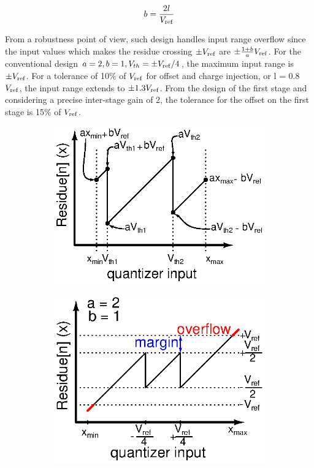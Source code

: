 \begin{equation}
b = \frac{2l}{V_{\rm ref}}
\end{equation}

From a robustness point of view, such design handles input range overflow since the input values which makes the residue crossing \(\pm V_{\rm ref}\) are \(\pm \frac{1+b}{a}V_{\rm ref}\). For the conventional design \(a=2, b=1, V_{th}=\pm V_{\rm ref}/4\), the maximum input range is \(\pm V_{\rm ref}\). For a tolerance of 10\% of \(V_{\rm ref}\) for offset and charge injection, or l = 0.8 \(V_{\rm ref}\), the input range extends to \(\pm 1.3 V_{\rm ref}\). From the design of the first stage and considering a precise inter-stage gain of 2, the tolerance for the offset on the first stage is 15\% of \(V_{\rm ref}\).

\begin{figure}[htp]
	\centering
	\begin{subfigure}[b]{0.32\textwidth}
		\centering
		\includegraphics[width=\textwidth]{Chapter4/Figs/3-levels-pattern-algo.ps}
		\label{fig:algo-general}
	\end{subfigure}
	\begin{subfigure}[b]{0.32\textwidth}
		\centering
		\includegraphics[width=\textwidth]{Chapter4/Figs/3-levels-pattern-algo-2-1.ps}

\end{subfigure}
\end{figure}
